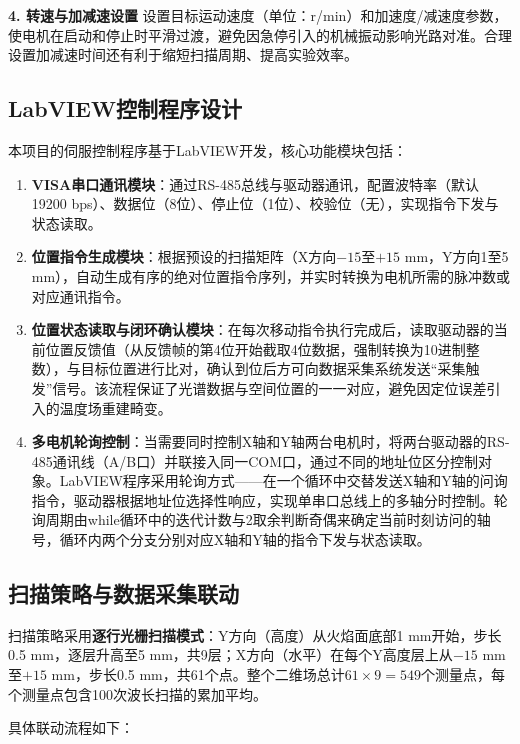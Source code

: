 \textbf{4. 转速与加减速设置}
设置目标运动速度（单位：r/min）和加速度/减速度参数，使电机在启动和停止时平滑过渡，避免因急停引入的机械振动影响光路对准。合理设置加减速时间还有利于缩短扫描周期、提高实验效率。

\subsection{LabVIEW控制程序设计}

本项目的伺服控制程序基于LabVIEW开发，核心功能模块包括：

\begin{enumerate}
	\item \textbf{VISA串口通讯模块}：通过RS-485总线与驱动器通讯，配置波特率（默认19200 bps）、数据位（8位）、停止位（1位）、校验位（无），实现指令下发与状态读取。
	
	\item \textbf{位置指令生成模块}：根据预设的扫描矩阵（X方向$-15$至$+15$ mm，Y方向1至5 mm），自动生成有序的绝对位置指令序列，并实时转换为电机所需的脉冲数或对应通讯指令。
	
	\item \textbf{位置状态读取与闭环确认模块}：在每次移动指令执行完成后，读取驱动器的当前位置反馈值（从反馈帧的第4位开始截取4位数据，强制转换为10进制整数），与目标位置进行比对，确认到位后方可向数据采集系统发送“采集触发”信号。该流程保证了光谱数据与空间位置的一一对应，避免因定位误差引入的温度场重建畸变。
	
	\item \textbf{多电机轮询控制}：当需要同时控制X轴和Y轴两台电机时，将两台驱动器的RS-485通讯线（A/B口）并联接入同一COM口，通过不同的地址位区分控制对象。LabVIEW程序采用轮询方式——在一个循环中交替发送X轴和Y轴的问询指令，驱动器根据地址位选择性响应，实现单串口总线上的多轴分时控制。轮询周期由while循环中的迭代计数与2取余判断奇偶来确定当前时刻访问的轴号，循环内两个分支分别对应X轴和Y轴的指令下发与状态读取。
\end{enumerate}

\subsection{扫描策略与数据采集联动}

扫描策略采用\textbf{逐行光栅扫描模式}：Y方向（高度）从火焰面底部1 mm开始，步长0.5 mm，逐层升高至5 mm，共9层；X方向（水平）在每个Y高度层上从$-15$ mm至$+15$ mm，步长0.5 mm，共61个点。整个二维场总计$61 \times 9 = 549$个测量点，每个测量点包含100次波长扫描的累加平均。

具体联动流程如下：

